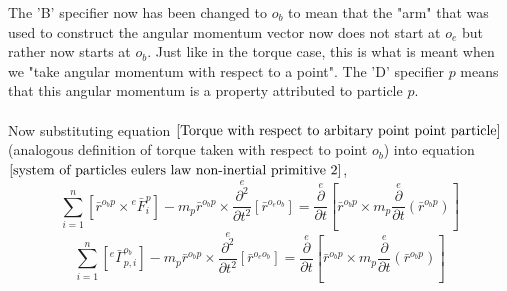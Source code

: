 The 'B' specifier now has been changed to $o_{b}$ to mean that the "arm" that was used to construct the angular momentum vector now does not start at $o_{e}$ but rather now starts at $o_{b}$.
Just like in the torque case, this is what is meant when we "take angular momentum with respect to a point".
The 'D' specifier $p$ means that this angular momentum is a property attributed to particle $p$.
\\~\\Now substituting equation $\ref{Torque with respect to arbitary point point particle}$ (analogous definition of torque taken with respect to point $o_{b}$) into equation $\ref{system of particles eulers law non-inertial primitive 2}$,
$$\sum^{n}_{i = 1}\left[\bar{r}^{o_{b}p}\times{}^{e}\bar{F}^{p}_{i}\right] - m_{p}\bar{r}^{o_{b}p}\times\overset{e}{\frac{\partial^{2}}{\partial t^{2}}}[\bar{r}^{o_{e}o_{b}}] = \overset{e}{\frac{\partial}{\partial t}}\left[\bar{r}^{o_{b}p}\times m_{p}\overset{e}{\frac{\partial}{\partial t}}(\bar{r}^{o_{b}p})\right]$$
\begin{equation}\sum^{n}_{i = 1}\left[{}^{e}\bar{\Gamma}^{o_{b}}_{p,i}\right] - m_{p}\bar{r}^{o_{b}p}\times\overset{e}{\frac{\partial^{2}}{\partial t^{2}}}[\bar{r}^{o_{e}o_{b}}] = \overset{e}{\frac{\partial}{\partial t}}\left[\bar{r}^{o_{b}p}\times m_{p}\overset{e}{\frac{\partial}{\partial t}}(\bar{r}^{o_{b}p})\right] \label{system of particles eulers law non-inertial primitive 3}\end{equation}

